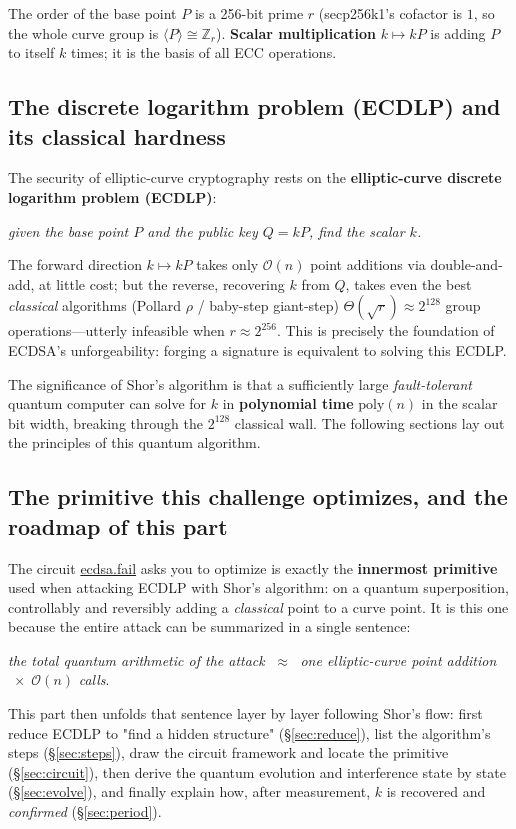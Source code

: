 \documentclass[11pt]{article}
\newcommand{\secref}[1]{\hyperref[#1]{\S\ref*{#1}}}
\begin{document}
The order of the base point $P$ is a 256-bit prime $r$ (secp256k1's cofactor is $1$, so the whole curve group is $\langle P\rangle\cong\mathbb{Z}_r$).
\textbf{Scalar multiplication} $k\mapsto kP$ is adding $P$ to itself $k$ times; it is the basis of all ECC operations.

\subsection{The discrete logarithm problem (ECDLP) and its classical hardness}

The security of elliptic-curve cryptography rests on the \textbf{elliptic-curve discrete logarithm problem (ECDLP)}:
\begin{center}
\emph{given the base point $P$ and the public key $Q=kP$, find the scalar $k$.}
\end{center}
The forward direction $k\mapsto kP$ takes only $\mathcal{O}(n)$ point additions via double-and-add, at little cost; but the reverse, recovering $k$ from $Q$, takes even the best \emph{classical}
algorithms (Pollard $\rho$ / baby-step giant-step) $\Theta(\sqrt r)\approx 2^{128}$ group operations---utterly infeasible when $r\approx 2^{256}$.
This is precisely the foundation of ECDSA's unforgeability: forging a signature is equivalent to solving this ECDLP.

The significance of Shor's algorithm is that a sufficiently large \emph{fault-tolerant} quantum computer can solve for $k$ in
\textbf{polynomial time} $\mathrm{poly}(n)$ in the scalar bit width, breaking through the $2^{128}$ classical wall. The following sections lay out the principles of this quantum algorithm.

\subsection{The primitive this challenge optimizes, and the roadmap of this part}

The circuit \href{https://ecdsa.fail}{ecdsa.fail} asks you to optimize is exactly the \textbf{innermost primitive} used when attacking ECDLP with Shor's algorithm:
on a quantum superposition, controllably and reversibly adding a \emph{classical} point to a curve point. It is this one because the entire attack can be summarized in a single sentence:
\begin{center}
\emph{the total quantum arithmetic of the attack} $\;\approx\;$ \emph{one elliptic-curve point addition} $\;\times\;\mathcal{O}(n)$ \emph{calls}.
\end{center}
This part then unfolds that sentence layer by layer following Shor's flow: first reduce ECDLP to "find a hidden structure" (\secref{sec:reduce}), list the algorithm's steps
(\secref{sec:steps}), draw the circuit framework and locate the primitive (\secref{sec:circuit}), then derive the quantum evolution and interference state by state
(\secref{sec:evolve}), and finally explain how, after measurement, $k$ is recovered and \emph{confirmed} (\secref{sec:period}).
\end{document}
